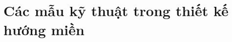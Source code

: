 \documentclass{report} %
\begin{document}
% 
% 
% 
% 
% 
% 
% 















\section{Các mẫu kỹ thuật trong thiết kế hướng miền}

\end{document}
